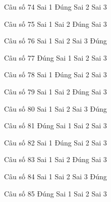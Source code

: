 \begin{ex}
Câu số 74
\choice
{Sai 1}
{\True Đúng}
{Sai 2}
{Sai 3}
\end{ex}

\begin{ex}
Câu số 75
\choice
{Sai 1}
{Sai 2}
{\True Đúng}
{Sai 3}
\end{ex}

\begin{ex}
Câu số 76
\choice
{Sai 1}
{Sai 2}
{Sai 3}
{\True Đúng}
\end{ex}
\begin{ex}
Câu số 77
\choice
{\True Đúng}
{Sai 1}
{Sai 2}
{Sai 3}
\end{ex}

\begin{ex}
Câu số 78
\choice
{Sai 1}
{\True Đúng}
{Sai 2}
{Sai 3}
\end{ex}

\begin{ex}
Câu số 79
\choice
{Sai 1}
{Sai 2}
{\True Đúng}
{Sai 3}
\end{ex}

\begin{ex}
Câu số 80
\choice
{Sai 1}
{Sai 2}
{Sai 3}
{\True Đúng}
\end{ex}
\begin{ex}
Câu số 81
\choice
{\True Đúng}
{Sai 1}
{Sai 2}
{Sai 3}
\end{ex}

\begin{ex}
Câu số 82
\choice
{Sai 1}
{\True Đúng}
{Sai 2}
{Sai 3}
\end{ex}

\begin{ex}
Câu số 83
\choice
{Sai 1}
{Sai 2}
{\True Đúng}
{Sai 3}
\end{ex}

\begin{ex}
Câu số 84
\choice
{Sai 1}
{Sai 2}
{Sai 3}
{\True Đúng}
\end{ex}
\begin{ex}
Câu số 85
\choice
{\True Đúng}
{Sai 1}
{Sai 2}
{Sai 3}
\end{ex}

